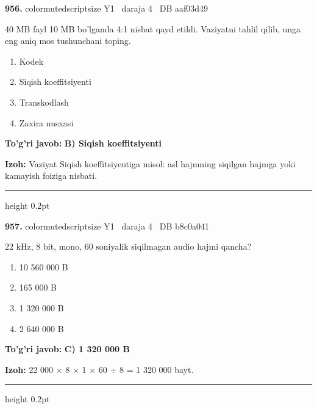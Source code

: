 \documentclass[10pt,a4paper,oneside]{article}
\begin{document}
\noindent\textbf{\color{ink}956.}  {color{muted}scriptsize Y1 \textbullet\ daraja 4 \textbullet\ DB aaf03d49}
\par
40 MB fayl 10 MB bo'lganda 4:1 nisbat qayd etildi. Vaziyatni tahlil qilib, unga eng aniq mos tushunchani toping.
\begin{enumerate}[label=\Alph*),leftmargin=9mm]
\item Kodek
\item Siqish koeffitsiyenti
\item Transkodlash
\item Zaxira nusxasi
\end{enumerate}
\begin{tcolorbox}[enhanced,breakable,colback=teal!4,colframe=teal!50!black,boxrule=0.5pt,arc=1.1mm,left=3mm,right=3mm,top=1.7mm,bottom=1.7mm,before skip=2mm,after skip=2mm]
\textbf{\color{teal}To'g'ri javob:} \textbf{B) Siqish koeffitsiyenti}
\par\smallskip
\textbf{Izoh:} Vaziyat Siqish koeffitsiyentiga misol: asl hajmning siqilgan hajmga yoki kamayish foiziga nisbati.
\end{tcolorbox}
\vspace{2mm}\hrule height 0.2pt \vspace{3mm}

\noindent\textbf{\color{ink}957.}  {color{muted}scriptsize Y1 \textbullet\ daraja 4 \textbullet\ DB b8c0a041}
\par
22 kHz, 8 bit, mono, 60 soniyalik siqilmagan audio hajmi qancha?
\begin{enumerate}[label=\Alph*),leftmargin=9mm]
\item 10 560 000 B
\item 165 000 B
\item 1 320 000 B
\item 2 640 000 B
\end{enumerate}
\begin{tcolorbox}[enhanced,breakable,colback=teal!4,colframe=teal!50!black,boxrule=0.5pt,arc=1.1mm,left=3mm,right=3mm,top=1.7mm,bottom=1.7mm,before skip=2mm,after skip=2mm]
\textbf{\color{teal}To'g'ri javob:} \textbf{C) 1 320 000 B}
\par\smallskip
\textbf{Izoh:} 22 000 \ensuremath{\times} 8 \ensuremath{\times} 1 \ensuremath{\times} 60 \ensuremath{\div} 8 = 1 320 000 bayt.
\end{tcolorbox}
\vspace{2mm}\hrule height 0.2pt \vspace{3mm}
\end{document}
